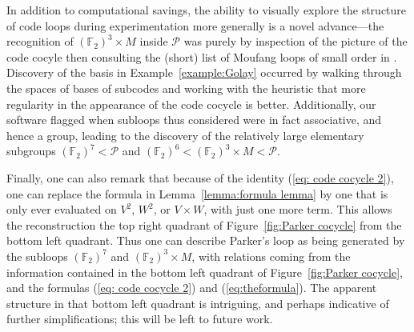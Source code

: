 \documentclass{article}
\theoremstyle{plain}
\theoremstyle{definition}
\def \cP {\mathcal{P}}
\def \FF {\mathbb{F}}
\begin{document}
In addition to computational savings, the ability to visually explore the structure of code loops during experimentation more generally is a novel advance---the recognition of $(\FF_2)^3\times M$ inside $\cP$ was purely by inspection of the picture of the code cocyle then consulting the (short) list of Moufang loops of small order in \cite{Chein}.
Discovery of the basis in Example~\ref{example:Golay} occurred by walking through the spaces of bases of subcodes and working with the heuristic that more regularity in the appearance of the code cocycle is better.
Additionally, our software flagged when subloops thus considered were in fact associative, and hence a group, leading to the discovery of the relatively large elementary subgroups $(\FF_2)^7 < \cP$ and $(\FF_2)^6 < (\FF_2)^3\times M < \cP$. 

Finally, one can also remark that because of the identity (\ref{eq: code cocycle 2}), one can replace the formula in Lemma~\ref{lemma:formula lemma} by one that is only ever evaluated on $V^2$, $W^2$, or $V\times W$, with just one more term. This allows the reconstruction the top right quadrant of Figure~\ref{fig:Parker cocycle} from the bottom left quadrant. 
Thus one can describe Parker's loop as being generated by the subloops $(\FF_2)^7$ and $(\FF_2)^3\times M$, with relations coming from the information contained in the bottom left quadrant of Figure~\ref{fig:Parker cocycle}, and the formulas (\ref{eq: code cocycle 2}) and (\ref{eq:theformula}).
The apparent structure in that bottom left quadrant is intriguing, and perhaps indicative of further simplifications; this will be left to future work.

\end{document}
